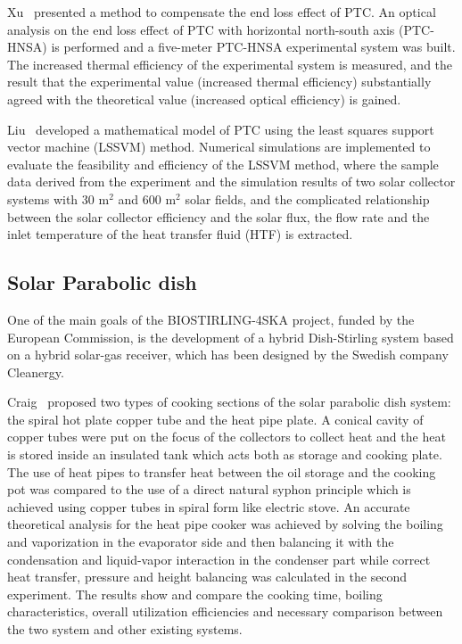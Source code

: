 Xu~\cite{Xu2014} presented a method to compensate the end loss effect of PTC. An optical analysis on the end loss effect of PTC with horizontal north-south axis (PTC-HNSA) is performed and a five-meter PTC-HNSA experimental system was built. The increased thermal efficiency of the experimental system is measured, and the result that the experimental value (increased thermal efficiency) substantially agreed with the theoretical value (increased optical efficiency) is gained.

Liu~\cite{Liu2012} developed a mathematical model of PTC using the least squares support vector machine (LSSVM) method. Numerical simulations are implemented to evaluate the feasibility and efficiency of the LSSVM method, where the sample data derived from the experiment and the simulation results of two solar collector systems with 30 m$^2$ and 600 m$^2$ solar fields, and the complicated relationship between the solar collector efficiency and the solar flux, the flow rate and the inlet temperature of the heat transfer fluid (HTF) is extracted.

\subsection{Solar Parabolic dish}\label{sec:pd}

One of the main goals of the BIOSTIRLING-4SKA project, funded by the European Commission, is the development of a hybrid Dish-Stirling system based on a hybrid solar-gas receiver, which has been designed by the Swedish company Cleanergy.~\cite{Blazquez2016}

Craig~\cite{Craig2016b} proposed two types of cooking sections of the solar parabolic dish system: the spiral hot plate copper tube and the heat pipe plate. A conical cavity of copper tubes were put on the focus of the collectors to collect heat and the heat is stored inside an insulated tank which acts both as storage and cooking plate. The use of heat pipes to transfer heat between the oil storage and the cooking pot was compared to the use of a direct natural syphon principle which is achieved using copper tubes in spiral form like electric stove. An accurate theoretical analysis for the heat pipe cooker was achieved by solving the boiling and vaporization in the evaporator side and then balancing it with the condensation and liquid-vapor interaction in the condenser part while correct heat transfer, pressure and height balancing was calculated in the second experiment. The results show and compare the cooking time, boiling characteristics, overall utilization efficiencies and necessary comparison between the two system and other existing systems.

